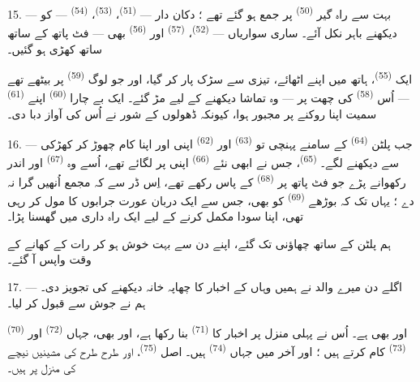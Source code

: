 15. --- بہت سے راہ گیر  \textsuperscript{(50)} پر جمع
ہو گئے تھے ؛ دکان دار —  \textsuperscript{(51)}،
 \textsuperscript{(53)}، 
\textsuperscript{(54)} —  کو دیکھنے باہر نکل آئے۔ ساری
سواریاں —  \textsuperscript{(52)}،
 \textsuperscript{(57)} اور  \textsuperscript{(56)} بھی — فٹ پاتھ کے ساتھ ساتھ کھڑی ہو گئیں۔

\VUsaut{3.0mm}

ایک  \textsuperscript{(55)}، ہاتھ میں اپنے
 اٹھائے، تیزی سے سڑک پار کر گیا، اور جو لوگ
 \textsuperscript{(59)} پر بیٹھے تھے — اُس
 \textsuperscript{(58)} کی چھت پر — وہ تماشا دیکھنے
کے لیے مڑ گئے۔ ایک بے چارا  \textsuperscript{(60)}
اپنے  \textsuperscript{(61)} سمیت اپنا 
روکنے پر مجبور ہوا، کیونکہ ڈھولوں کے شور نے اُس کی آواز دبا دی۔

16. --- جب پلٹن  \textsuperscript{(64)} کے سامنے
پہنچی تو  \textsuperscript{(63)} اور
 \textsuperscript{(62)} اپنی  اور
اپنا کام چھوڑ کر کھڑکی سے دیکھنے لگے۔ 
\textsuperscript{(65)}، جس نے ابھی نئے 
\textsuperscript{(66)} اپنی  پر لگائے تھے، اُسے
وہ  \textsuperscript{(67)} اور  اندر
رکھوانے پڑے جو فٹ پاتھ پر  \textsuperscript{(68)}
کے پاس رکھے تھے، اِس ڈر سے کہ مجمع اُنھیں گرا نہ دے ؛ یہاں تک کہ
بوڑھے  \textsuperscript{(69)} کو بھی، جس سے ایک
دربان عورت جرابوں کا مول کر رہی تھی، اپنا سودا مکمل کرنے کے لیے ایک
راہ داری میں گھسنا پڑا۔

ہم پلٹن کے ساتھ چھاؤنی تک گئے،  اپنے دن سے بہت خوش ہو کر
رات کے کھانے کے وقت واپس آ گئے۔

\VUsaut{3.0mm}

17. --- اگلے دن میرے والد نے ہمیں وہاں کے اخبار کا چھاپہ خانہ دیکھنے
کی تجویز دی۔ ہم نے جوش سے قبول کر لیا۔

  \textsuperscript{(70)}
  
اور  بھی ہے۔ اُس نے پہلی منزل پر اخبار کا
 \textsuperscript{(71)} بنا رکھا ہے، اور
 بھی، جہاں 
\textsuperscript{(72)} اور 
\textsuperscript{(73)} کام کرتے ہیں ؛ اور آخر میں 
جہاں  \textsuperscript{(74)} ہیں۔ اصل
 \textsuperscript{(75)}، 
اور طرح طرح کی مشینیں نیچے کی منزل پر ہیں۔

